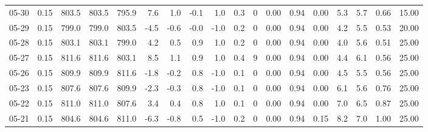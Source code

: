\begin{threeparttable}
{\begin{tabular}{lrrrrrrrrrrrrrrrrr}
  05-30 &     0.15 & 803.5 & 803.5 & 795.9 &        7.6 &            1.0 &                      -0.1 &                      1.0 &                 0.3 &              0 &       0.00 &      0.94 &           0.00 &              5.3 &                 5.7 &            0.66 &                  15.00 \\
  05-29 &     0.15 & 799.0 & 799.0 & 803.5 &       -4.5 &           -0.6 &                      -0.0 &                     -1.0 &                 0.2 &              0 &       0.00 &      0.94 &           0.00 &              4.2 &                 5.5 &            0.53 &                  20.00 \\
  05-28 &     0.15 & 803.1 & 803.1 & 799.0 &        4.2 &            0.5 &                       0.9 &                      1.0 &                 0.2 &              0 &       0.00 &      0.94 &           0.00 &              4.0 &                 5.6 &            0.51 &                  25.00 \\
  05-27 &     0.15 & 811.6 & 811.6 & 803.1 &        8.5 &            1.1 &                       0.9 &                      1.0 &                 0.4 &              9 &       0.00 &      0.94 &           0.00 &              4.4 &                 6.1 &            0.56 &                  25.00 \\
  05-26 &     0.15 & 809.9 & 809.9 & 811.6 &       -1.8 &           -0.2 &                       0.8 &                     -1.0 &                 0.1 &              0 &       0.00 &      0.94 &           0.00 &              4.5 &                 5.5 &            0.56 &                  25.00 \\
  05-23 &     0.15 & 807.6 & 807.6 & 809.9 &       -2.3 &           -0.3 &                       0.8 &                     -1.0 &                 0.1 &              0 &       0.00 &      0.94 &           0.00 &              6.1 &                 5.6 &            0.76 &                  25.00 \\
  05-22 &     0.15 & 811.0 & 811.0 & 807.6 &        3.4 &            0.4 &                       0.8 &                      1.0 &                 0.1 &              0 &       0.00 &      0.94 &           0.00 &              7.0 &                 6.5 &            0.87 &                  25.00 \\
  05-21 &     0.15 & 804.6 & 804.6 & 811.0 &       -6.3 &           -0.8 &                       0.5 &                     -1.0 &                 0.2 &              0 &       0.00 &      0.94 &           0.15 &              8.2 &                 7.0 &            1.00 &                  25.00 \\

\end{tabular}}
\end{threeparttable}

